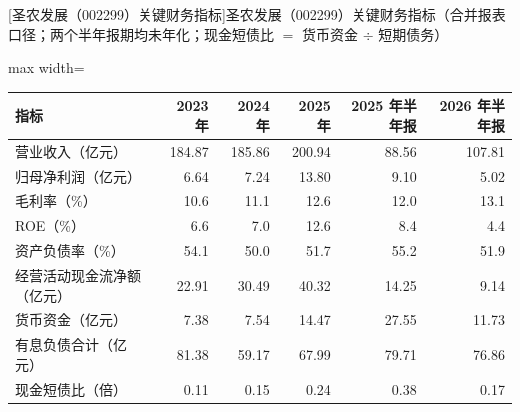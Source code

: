 \begin{center}\small\setlength{\tabcolsep}{3.4pt}
[圣农发展（002299）关键财务指标]{圣农发展（002299）关键财务指标（合并报表口径；两个半年报期均未年化；现金短债比 $=$ 货币资金 $\div$ 短期债务）}
\begin{adjustbox}{max width=\textwidth}
\begin{tabular}{@{}lrrrrr@{}}
\toprule
指标 & 2023 年 & 2024 年 & 2025 年 & 2025 年半年报 & 2026 年半年报 \\
\midrule
营业收入（亿元） & 184.87 & 185.86 & 200.94 & 88.56 & 107.81 \\
归母净利润（亿元） & 6.64 & 7.24 & 13.80 & 9.10 & 5.02 \\
毛利率（\%） & 10.6 & 11.1 & 12.6 & 12.0 & 13.1 \\
ROE（\%） & 6.6 & 7.0 & 12.6 & 8.4 & 4.4 \\
资产负债率（\%） & 54.1 & 50.0 & 51.7 & 55.2 & 51.9 \\
经营活动现金流净额（亿元） & 22.91 & 30.49 & 40.32 & 14.25 & 9.14 \\
货币资金（亿元） & 7.38 & 7.54 & 14.47 & 27.55 & 11.73 \\
有息负债合计（亿元） & 81.38 & 59.17 & 67.99 & 79.71 & 76.86 \\
现金短债比（倍） & 0.11 & 0.15 & 0.24 & 0.38 & 0.17 \\
\bottomrule
\end{tabular}
\end{adjustbox}
\end{center}

